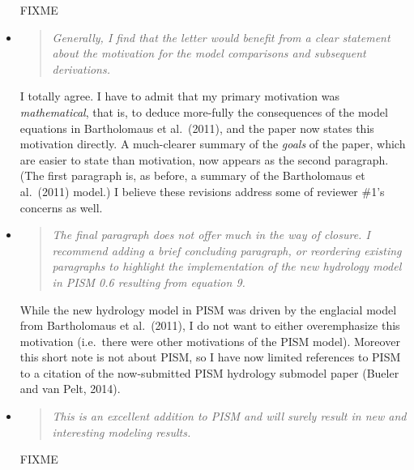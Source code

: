 \documentclass[11pt,reqno]{amsart}
\newcommand{\reply}[2]{
\medskip\medskip
\item  \begin{quote}
\emph{#1}
\end{quote}

\medskip
\noindent #2}
\begin{document}
\begin{itemize}
{\begin{itemize}
FIXME
\end{itemize}}

\reply{Generally, I find that the letter would benefit from a clear statement about the motivation for the model comparisons and subsequent derivations.}
{I totally agree.  I have to admit that my primary motivation was \emph{mathematical}, that is, to deduce more-fully the consequences of the model equations in Bartholomaus et al.~(2011), and the paper now states this motivation directly.  A much-clearer summary of the \emph{goals} of the paper, which are easier to state than motivation, now appears as the second paragraph.  (The first paragraph is, as before, a summary of the Bartholomaus et al.~(2011) model.)  I believe these revisions address some of reviewer \#1's concerns as well.}

\reply{The final paragraph does not offer much in the way of closure. I recommend adding a brief concluding paragraph, or reordering existing paragraphs to highlight the implementation of the new hydrology model in PISM 0.6 resulting from equation 9.}
{While the new hydrology model in PISM was driven by the englacial model from Bartholomaus et al.~(2011), I do not want to either overemphasize this motivation (i.e.~there were other motivations of the PISM model).  Moreover this short note is not about PISM, so I have now limited references to PISM to a citation of the now-submitted PISM hydrology submodel paper (Bueler and van Pelt, 2014).}

\reply{This is an excellent addition to PISM and will surely result in new and interesting modeling results.}
{FIXME}
\end{itemize}
\end{document}
